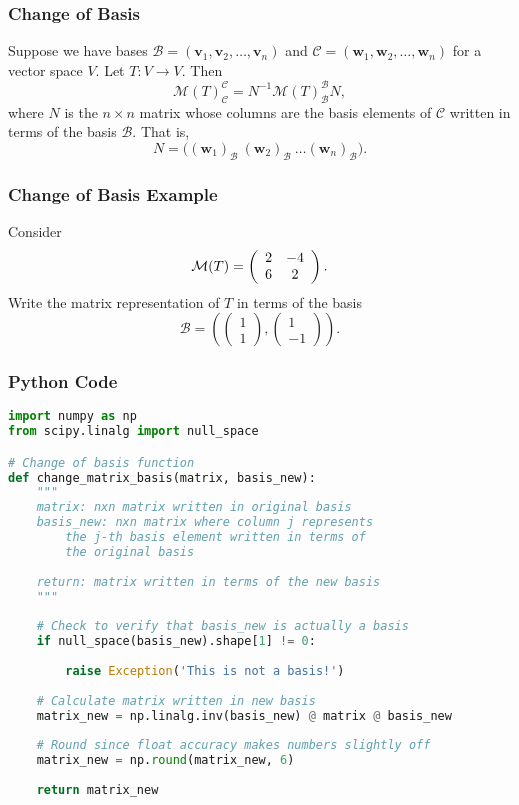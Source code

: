 \documentclass{beamer}
\begin{document}
\begin{frame}
\frametitle{Change of Basis}
Suppose we have bases $\mathcal{B} = ({\boldsymbol  v_1}, {\boldsymbol v_2}, \ldots, {\boldsymbol  v_n})$ and $\mathcal{C} = ({\boldsymbol  w_1}, {\boldsymbol w_2}, \ldots, {\boldsymbol w_n})$ for a vector space $V$. Let $T: V\to V$. Then
$$
\mathcal{M}(T)_{\mathcal{C}}^{\mathcal{C}} = N^{-1} \mathcal{M}(T)_{\mathcal{B}}^{\mathcal{B}} N,
$$
where $N$ is the $n\times n$ matrix whose columns are the basis elements of $\mathcal{C}$ written in terms of the basis $\mathcal{B}$. That is,
$$
N = \Big(({\boldsymbol w_1})_\mathcal{B}\ ({\boldsymbol  w_2})_\mathcal{B}\ \ldots ({\boldsymbol  w_n})_\mathcal{B}\Big).
$$
\end{frame}


\begin{frame}[t]
\frametitle{Change of Basis Example}
\tiny
\begin{Example}
Consider
$$
\mathcal{M}(T) = \left(\begin{array}{c c} 2	&	-4\\ 6		& 2\end{array}\right).
$$
Write the matrix representation of $T$ in terms of the basis
$$
\mathcal{B} = \left(\left(\begin{array}{c} 1\\ 1\end{array}\right), \left(\begin{array}{c} 1\\ -1\end{array}\right)\right).
$$
\end{Example}

\end{frame}

\begin{frame}[fragile]
\frametitle{Python Code}

\begin{lstlisting}[language=Python]
import numpy as np
from scipy.linalg import null_space

# Change of basis function
def change_matrix_basis(matrix, basis_new):
    """
    matrix: nxn matrix written in original basis
    basis_new: nxn matrix where column j represents 
        the j-th basis element written in terms of 
        the original basis
        
    return: matrix written in terms of the new basis
    """
    
    # Check to verify that basis_new is actually a basis
    if null_space(basis_new).shape[1] != 0:
        
        raise Exception('This is not a basis!')
    
    # Calculate matrix written in new basis
    matrix_new = np.linalg.inv(basis_new) @ matrix @ basis_new
    
    # Round since float accuracy makes numbers slightly off
    matrix_new = np.round(matrix_new, 6)
    
    return matrix_new
\end{lstlisting}

\end{frame}
\end{document}
